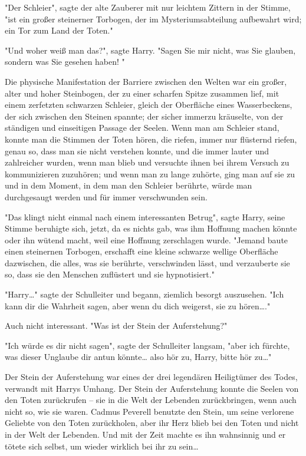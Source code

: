 {"Der Schleier", sagte der alte Zauberer mit nur leichtem Zittern in der Stimme, "ist ein großer steinerner Torbogen, der im Mysteriumsabteilung aufbewahrt wird; ein Tor zum Land der Toten."

"Und woher weiß man das?", sagte Harry. "Sagen Sie mir nicht, was Sie glauben, sondern was Sie gesehen haben! "

Die physische Manifestation der Barriere zwischen den Welten war ein großer, alter und hoher Steinbogen, der zu einer scharfen Spitze zusammen lief, mit einem zerfetzten schwarzen Schleier, gleich der Oberfläche eines Wasserbeckens, der sich zwischen den Steinen spannte; der sicher immerzu kräuselte, von der ständigen und einseitigen Passage der Seelen. Wenn man am Schleier stand, konnte man die Stimmen der Toten hören, die riefen, immer nur flüsternd riefen, genau so, dass man sie nicht verstehen konnte, und die immer lauter und zahlreicher wurden, wenn man blieb und versuchte ihnen bei ihrem Versuch zu kommunizieren zuzuhören; und wenn man zu lange zuhörte, ging man auf sie zu und in dem Moment, in dem man den Schleier berührte, würde man durchgesaugt werden und für immer verschwunden sein.

"Das klingt nicht einmal nach einem interessanten Betrug", sagte Harry, seine Stimme beruhigte sich, jetzt, da es nichts gab, was ihm Hoffnung machen könnte oder ihn wütend macht, weil eine Hoffnung zerschlagen wurde. "Jemand baute einen steinernen Torbogen, erschafft eine kleine schwarze wellige Oberfläche dazwischen, die alles, was sie berührte, verschwinden lässt, und verzauberte sie so, dass sie den Menschen zuflüstert und sie hypnotisiert."

"Harry…" sagte der Schulleiter und begann, ziemlich besorgt auszusehen. "Ich kann dir die Wahrheit sagen, aber wenn du dich weigerst, sie zu hören…."

Auch nicht interessant. "Was ist der Stein der Auferstehung?"

"Ich würde es dir nicht sagen", sagte der Schulleiter langsam, "aber ich fürchte, was dieser Unglaube dir antun könnte… also hör zu, Harry, bitte hör zu…"

Der Stein der Auferstehung war eines der drei legendären Heiligtümer des Todes, verwandt mit Harrys Umhang. Der Stein der Auferstehung konnte die Seelen von den Toten zurückrufen -- sie in die Welt der Lebenden zurückbringen, wenn auch nicht so, wie sie waren. Cadmus Peverell benutzte den Stein, um seine verlorene Geliebte von den Toten zurückholen, aber ihr Herz blieb bei den Toten und nicht in der Welt der Lebenden. Und mit der Zeit machte es ihn wahnsinnig und er tötete sich selbst, um wieder wirklich bei ihr zu sein…

}
